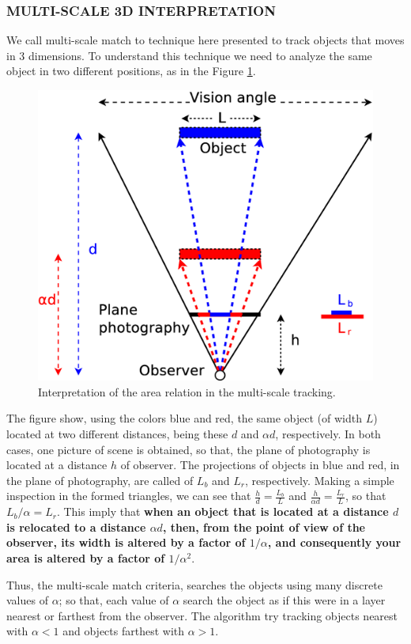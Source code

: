 \subsubsection{MULTI-SCALE 3D INTERPRETATION}
We call multi-scale match to technique here presented 
to track objects that moves in 3 dimensions. 
To understand this technique we need to analyze the same object in 
two different positions, as in the Figure \ref{fig:multiscale3d}.

\begin{figure}[H]
\centering
  \includegraphics[width=.7\columnwidth]{images/Diagrama3.eps}
  \caption{Interpretation of the area relation in the multi-scale tracking.}
  \label{fig:multiscale3d}
\end{figure}
The figure show, using the colors blue and red, the same object (of width $L$) located at two 
different distances, being these $d$ and $\alpha d$, respectively. 
In both cases, one picture of scene is obtained,
so that, the plane of photography is located at a distance $h$ of observer.
The projections of objects in blue and red, in the plane of photography, are
called of $L_b$ and $L_r$, respectively. Making a simple inspection in the
formed triangles, we can see that $\frac{h}{d}=\frac{L_b}{L}$ and 
$\frac{h}{\alpha d}=\frac{L_r}{L}$, so that $L_b/\alpha= L_r$. 
This imply that \textbf{when an object that is located
at a distance $d$ is relocated to a distance  $\alpha d$, then,
from the point of view of the observer, its width is altered by a factor of $1/\alpha$,
and consequently your area is altered by a factor of $1/\alpha^2$}.

Thus, the multi-scale match criteria, searches the objects
using many discrete values of $\alpha$; so that, each value of $\alpha$
search the object as if this were in a layer nearest or farthest from the observer.
The algorithm try tracking objects nearest with $\alpha<1$ and objects farthest with $\alpha>1$.

